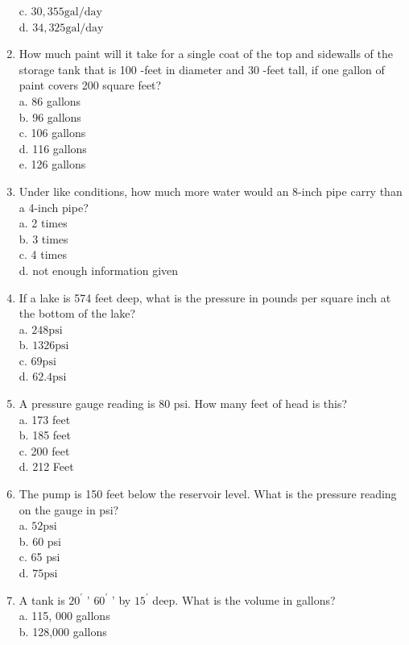 \begin{enumerate}
c. $30,355 \mathrm{gal} / \mathrm{day}$\\
d. $34,325 \mathrm{gal} / \mathrm{day}$\\
\item How much paint will it take for a single coat of the top and sidewalls of the storage tank that is 100 -feet in diameter and 30 -feet tall, if one gallon of paint covers 200 square feet?\\
a. 86 gallons\\
b. 96 gallons\\
c. 106 gallons\\
d. 116 gallons\\
e. 126 gallons\\
\item Under like conditions, how much more water would an 8-inch pipe carry than a 4-inch pipe?\\
a. 2 times\\
b. 3 times\\
c. 4 times\\
d. not enough information given\\
\item If a lake is 574 feet deep, what is the pressure in pounds per square inch at the bottom of the lake?\\
a. $248 \mathrm{psi}$\\
b. $1326 \mathrm{psi}$\\
c. $69 \mathrm{psi}$\\
d. $62.4 \mathrm{psi}$\\
\item A pressure gauge reading is 80 psi. How many feet of head is this?\\
a. 173 feet\\
b. 185 feet\\
c. 200 feet\\
d. 212 Feet
\item The pump is 150 feet below the reservoir level. What is the pressure reading on the gauge in psi?\\
a. $52 \mathrm{psi}$\\
b. 60 psi\\
c. 65 psi\\
d. $75 \mathrm{psi}$\\
\item A tank is $20^{\prime}$ ' $60^{\prime}$ ' by $15^{\prime}$ deep. What is the volume in gallons?\\
a. 115, 000 gallons\\
b. 128,000 gallons\\

\end{enumerate}
